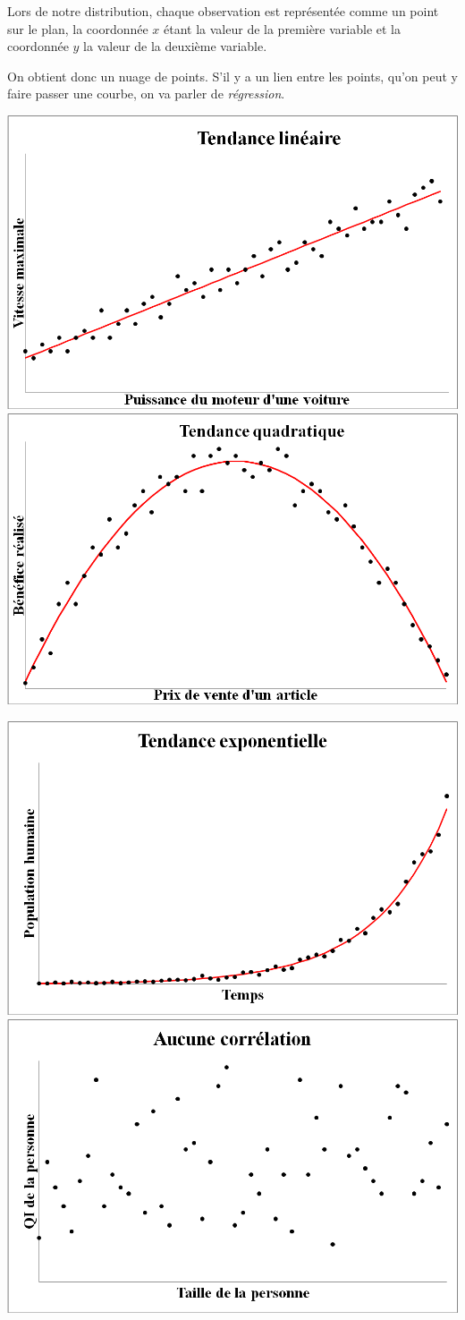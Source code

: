Lors de notre distribution, chaque observation est représentée comme un point sur le plan, la coordonnée $x$ étant la valeur de la première variable et la coordonnée $y$ la valeur de la deuxième variable.

On obtient donc un nuage de points. S'il y a un lien entre les points, qu'on peut y faire passer une courbe, on va parler de \emph{régression}. 

\begin{center}
\includegraphics[width = 0.4 \textwidth]{statistiques/image/regression1.png} \hspace{5mm}
\includegraphics[width = 0.4 \textwidth]{statistiques/image/regression2.png}

\vspace{5mm}

\includegraphics[width = 0.4 \textwidth]{statistiques/image/regression3.png} \hspace{5mm}
\includegraphics[width = 0.4 \textwidth]{statistiques/image/regression4.png}
\end{center}

